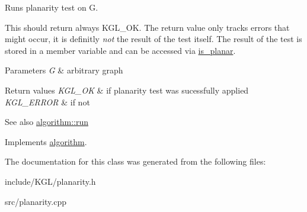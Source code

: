 Runs planarity test on {\ttfamily G}. 

This should return always {\ttfamily K\+G\+L\+\_\+\+OK}. The return value only tracks errors that might occur, it is definitly {\itshape not} the result of the test itself. The result of the test is stored in a member variable and can be accessed via \mbox{\hyperlink{classplanarity_af60c3d06cffa7ce3a470797fd758be5f}{is\+\_\+planar}}.


\begin{DoxyParams}{Parameters}
{\em G} & arbitrary graph\\
\hline
\end{DoxyParams}

\begin{DoxyRetVals}{Return values}
{\em K\+G\+L\+\_\+\+OK} & if planarity test was sucessfully applied \\
\hline
{\em K\+G\+L\+\_\+\+E\+R\+R\+OR} & if not\\
\hline
\end{DoxyRetVals}
\begin{DoxySeeAlso}{See also}
\mbox{\hyperlink{classalgorithm_a734b189509a8d6b56b65f8ff772d43ca}{algorithm\+::run}} 
\end{DoxySeeAlso}


Implements \mbox{\hyperlink{classalgorithm_a734b189509a8d6b56b65f8ff772d43ca}{algorithm}}.



The documentation for this class was generated from the following files\+:\begin{DoxyCompactItemize}
\item 
include/\+K\+G\+L/planarity.\+h\item 
src/planarity.\+cpp\end{DoxyCompactItemize}
